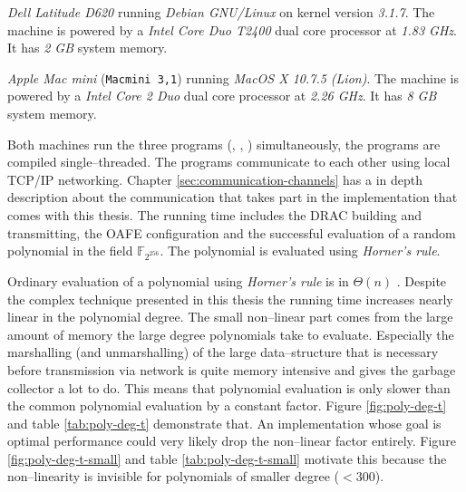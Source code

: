 \label{sec:evaluation}

\label{sec:test-setup}

\label{sec:test-machines}


\emph{Dell Latitude D620} running \emph{Debian GNU/Linux} on kernel version
\emph{3.1.7}. The machine is powered by a \emph{Intel\TReg{} Core Duo T2400}
dual core processor at \emph{1.83 GHz}. It has \emph{2 GB} system memory.



\emph{Apple Mac mini} (\texttt{Macmini 3,1}) running \emph{MacOS X 10.7.5
(Lion)}. The machine is powered by a \emph{Intel\TReg{} Core 2 Duo} dual core
processor at \emph{2.26 GHz}. It has \emph{8 GB} system memory.


Both machines run the three programs (\JWBpOne{}, \JWBpTwo{}, \JWBtoken{})
simultaneously, the programs are compiled single--threaded. The programs
communicate to each other using local TCP/IP networking. Chapter
\ref{sec:communication-channels} has a in depth description about the
communication that takes part in the implementation that comes with this thesis.
The running time includes the DRAC building and transmitting, the OAFE
configuration and the successful evaluation of a random polynomial in the field
$\mathbb{F}_{2^{256}}$. The polynomial is evaluated using \emph{Horner's
rule}\cite{cormen01}.


\label{sec:running-time}

Ordinary evaluation of a polynomial using \emph{Horner's rule} is in $\Theta(n)$
\cite{cormen01}. Despite the complex technique presented in this thesis the
running time increases nearly linear in the polynomial degree. The small
non--linear part comes from the large amount of memory the large degree
polynomials take to evaluate. Especially the marshalling (and unmarshalling) of
the large data--structure that is necessary before transmission via network is
quite memory intensive and gives the garbage collector a lot to do. This means
that polynomial evaluation is only slower than the common polynomial evaluation
by a constant factor. Figure \ref{fig:poly-deg-t} and table \ref{tab:poly-deg-t}
demonstrate that. An implementation whose goal is optimal performance could very
likely drop the non--linear factor entirely. Figure \ref{fig:poly-deg-t-small}
and table \ref{tab:poly-deg-t-small} motivate this because the non--linearity is
invisible for polynomials of smaller degree ($< 300$).

